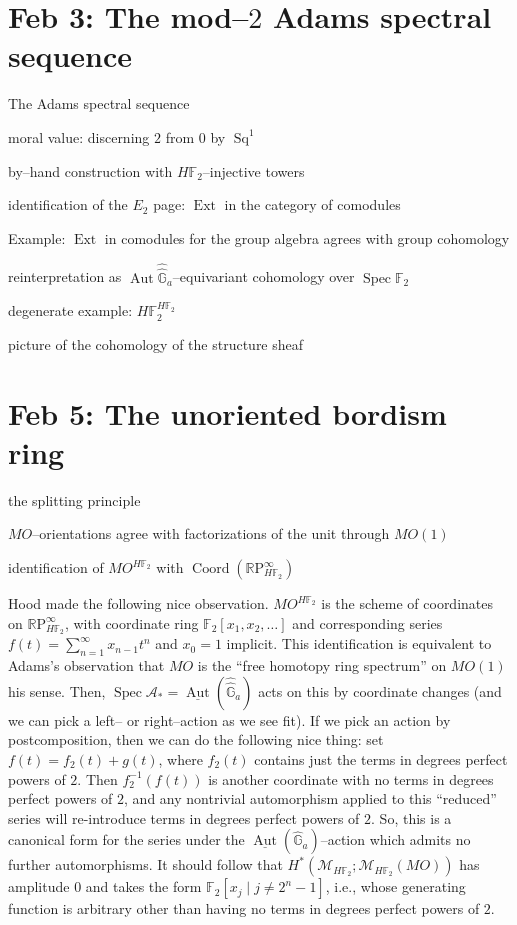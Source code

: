 \documentclass{article}
\newcommand{\F}{\mathbb F}
\newcommand{\G}{\widehat{\mathbb G}}
\newcommand{\R}{\mathbb R}
\newcommand{\RP}{\R\mathrm P}
\newcommand{\<}{\langle}
\renewcommand{\>}{\rangle}
\newcommand{\context}[1]{\mathcal{M}_{#1}}
\DeclareMathOperator{\Spec}{Spec}
\DeclareMathOperator{\Sq}{Sq}
\DeclareMathOperator{\Aut}{Aut}
\DeclareMathOperator{\Ext}{Ext}
\DeclareMathOperator{\Coord}{Coord}
\numberwithin{equation}{section}
\theoremstyle{plain}
\theoremstyle{definition}
\theoremstyle{remark}
\begin{document}









\section{Feb 3: The mod--$2$ Adams spectral sequence}

The Adams spectral sequence

moral value: discerning $2$ from $0$ by $\Sq^1$

by--hand construction with $H\F_2$--injective towers

identification of the $E_2$ page: $\Ext$ in the category of comodules

Example: $\Ext$ in comodules for the group algebra agrees with group cohomology

reinterpretation as $\Aut \widehat \G_a$--equivariant cohomology over $\Spec \F_2$

degenerate example: $H\F_2^{H\F_2}$

picture of the cohomology of the structure sheaf






\section{Feb 5: The unoriented bordism ring}

the splitting principle

$MO$--orientations agree with factorizations of the unit through $MO(1)$

identification of $MO^{H\F_2}$ with $\Coord(\RP^\infty_{H\F_2})$

Hood made the following nice observation. $MO^{H\F_2}$ is the scheme of coordinates on $\RP^\infty_{H\F_2}$, with coordinate ring $\F_2[x_1, x_2, \ldots]$ and corresponding series $f(t) = \sum_{n=1}^\infty x_{n-1} t^n$ and $x_0 = 1$ implicit. This identification is equivalent to Adams's observation that $MO$ is the ``free homotopy ring spectrum'' on $MO(1)$ his sense. Then, $\Spec \mathcal{A}_* = \underline{\operatorname{Aut}}(\widehat{\G}_a)$ acts on this by coordinate changes (and we can pick a left-- or right--action as we see fit). If we pick an action by postcomposition, then we can do the following nice thing: set $f(t) = f_2(t) + g(t)$, where $f_2(t)$ contains just the terms in degrees perfect powers of $2$. Then $f_2^{-1}(f(t))$ is another coordinate with no terms in degrees perfect powers of $2$, and any nontrivial automorphism applied to this ``reduced'' series will re-introduce terms in degrees perfect powers of $2$.  So, this is a canonical form for the series under the $\underline{\operatorname{Aut}}(\widehat{\mathbb G}_a)$--action which admits no further automorphisms. It should follow that $H^*(\context{H\F_2}; \context{H\F_2}(MO))$ has amplitude $0$ and takes the form $\F_2[x_j \mid j \ne 2^n - 1]$, i.e., whose generating function is arbitrary other than having no terms in degrees perfect powers of $2$.
\end{document}

